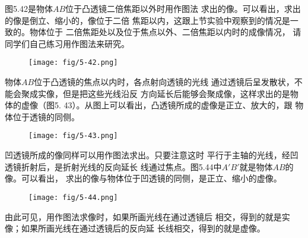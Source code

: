         图5.42是物体$AB$位于凸透镜二倍焦距以外时用作图法
        求出的像。可以看出，求出的像是倒立、缩小的，像位于二倍
        焦距以内，这跟上节实验中观察到的情况是一致的。物体位于
        二倍焦距处以及位于焦点以外、二倍焦距以内时的成像情况，
        请同学们自己练习用作图法来研究。
        \begin{figure}[htp]\centering
            \texttt{[image: fig/5-42.png]}
            \caption{}
            \end{figure}

            物体$AB$位于凸透镜的焦点以内时，各点射向透镜的光线
            通过透镜后呈发散状，不能会聚成实像，但是把这些光线沿反
            方向延长后能够会聚成像，这样求出的是物体的虚像（图5.
            43）。从图上可以看出，凸透镜所成的虚像是正立、放大的，跟
            物体位于透镜的同侧。

            \begin{figure}[htp]\centering
                \texttt{[image: fig/5-43.png]}
                \caption{}
                \end{figure}

                凹透镜所成的像同样可以用作图法求出。只要注意这时
                平行于主轴的光线，经凹透镜折射后，是折射光线的反向延长
                线通过焦点。图5.44中$A'B'$就是物体$AB$的像。可以看出，
                求出的像与物体位于凹透镜的同侧，是正立、缩小的虚像。

                \begin{figure}[htp]\centering
                    \texttt{[image: fig/5-44.png]}
                    \caption{}
                    \end{figure}

                    由此可见，用作图法求像时，如果所画光线在通过透镜后
                    相交，得到的就是实像；如果所画光线在通过透镜后的反向延
                    长线相交，得到的就是虚像。



